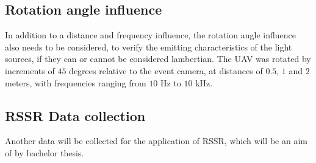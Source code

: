 \subsection{Rotation angle influence}

In addition to a distance and frequency influence, the rotation angle influence also needs to be considered, to
verify the emitting characteristics of the light sources, if they can or cannot be considered lambertian.
The UAV was rotated by increments of $45$ degrees relative to the event camera, at distances of $0.5$, $1$ and $2$ meters,
with frequencies ranging from $10$ Hz to $10$ kHz. 

\subsection{RSSR Data collection}

Another data will be collected for the application of \ac{RSSR}, which will be an aim of by bachelor thesis.